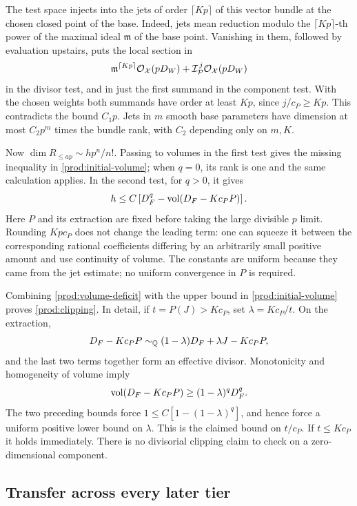 The test space injects into the jets of order $\lceil Kp\rceil$ of
this vector bundle at the chosen closed point of the base.  Indeed,
jets mean reduction modulo the $\lceil Kp\rceil$-th power of the
maximal ideal $\mathfrak m$ of the base point.  Vanishing in them,
followed by evaluation upstairs, puts the local section in
\[
 \mathfrak m^{\lceil Kp\rceil}\mathcal O_{\mathcal X}(pD_W)
 +\mathcal I_{\mathcal P}^{\,j}\mathcal O_{\mathcal X}(pD_W)
\]
in the divisor test, and in just the first summand in the component
test.  With the chosen weights both summands have order at least $Kp$, since
$j/c_P\geq Kp$.  This contradicts the bound $C_1p$.  Jets in $m$ smooth
base parameters have dimension at most $C_2p^m$ times the bundle rank,
with $C_2$ depending only on $m,K$.

Now $\dim R_{\leq ap}\sim hp^n/n!$.  Passing to volumes in the first
test gives the missing inequality in \eqref{prod:initial-volume};
when $q=0$, its rank is one and the same calculation applies.  In the
second test, for $q>0$, it gives
\begin{equation}\label{prod:volume-deficit}
 h\leq C\left[D_F^q-\operatorname{vol}(D_F-Kc_PP)\right].
\end{equation}
Here $P$ and its extraction are fixed before taking the large divisible
$p$ limit.  Rounding $Kpc_P$ does not change the leading term: one can
squeeze it between the corresponding rational coefficients differing
by an arbitrarily small positive amount and use continuity of volume.
The constants are uniform because they came from the jet estimate;
no uniform convergence in $P$ is required.

Combining \eqref{prod:volume-deficit} with the upper bound in
\eqref{prod:initial-volume} proves \eqref{prod:clipping}.  In detail,
if $t=P(J)>Kc_P$, set $\lambda=Kc_P/t$.  On the extraction,
\[
 D_F-Kc_PP\sim_{\mathbb Q}(1-\lambda)D_F+
                         \lambda J-Kc_PP,
\]
and the last two terms together form an effective divisor.
Monotonicity and homogeneity of volume imply
\[
 \operatorname{vol}(D_F-Kc_PP)\geq(1-\lambda)^qD_F^q.
\]
The two preceding bounds force
$1\leq C[1-(1-\lambda)^q]$, and hence force a uniform positive
lower bound on $\lambda$.  This is the claimed bound on $t/c_P$.
If $t\leq Kc_P$ it holds immediately.  There is no divisorial clipping
claim to check on a zero-dimensional component.

\subsection{Transfer across every later tier}

